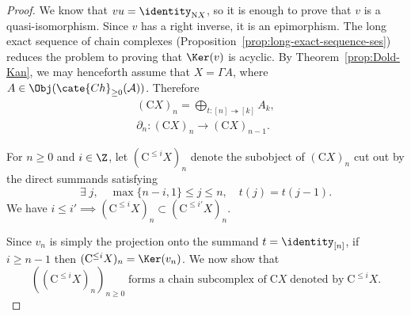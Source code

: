 \begin{proof}
	We know that $vu=\identity_{\mathrm{N}X}$, so it is enough to prove that
	$v$ is a quasi-isomorphism. Since $v$ has a right inverse, it is an
	epimorphism. The long exact sequence of chain complexes
	(Proposition~\ref{prop:long-exact-sequence-ses}) reduces the problem to
	proving that $\Ker(v)$ is acyclic. By Theorem~\ref{prop:Dold-Kan}, we may
	henceforth assume that $X=\Gamma A$, where
	$A\in\Obj(\cate{Ch}_{\geq0}(\mathcal{A}))$. Therefore
	\begin{gather*}
		(\mathrm{C}X)_n = \bigoplus_{t: [n] \twoheadrightarrow [k]} A_k, \\
		\partial_n : (\mathrm{C}X)_n \to (\mathrm{C}X)_{n-1}.
	\end{gather*}

	For $n\geq0$ and $i\in\Z$, let $(\mathrm{C}^{\leq i}X)_n$ denote the
	subobject of $(\mathrm{C}X)_n$ cut out by the direct summands satisfying
	\[ \exists \; j, \quad \max\{n-i, 1\} \leq j \leq n, \quad t(j) = t(j-1). \]
	We have $i\leq i'\implies(\mathrm{C}^{\leq i}X)_n\subset
	(\mathrm{C}^{\leq i'}X)_n$.

	Since $v_n$ is simply the projection onto the summand
	$t=\identity_{[n]}$, if $i\geq n-1$ then
	$(\mathrm{C}^{\leq i}X)_n=\Ker(v_n)$. We now show that
	\begin{equation}\label{eqn:Dold-Kan-N-C-aux0}
		\left( (\mathrm{C}^{\leq i} X)_n \right)_{n \geq 0} \;\text{forms a chain subcomplex of}\; \mathrm{C}X \;\text{denoted by}\; \mathrm{C}^{\leq i} X.
	\end{equation}


\end{proof}
